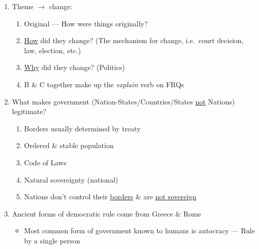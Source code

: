 \documentclass[12pt]{article}
\begin{document}
\begin{enumerate}
\begin{itemize}
    \end{itemize}

  \item Theme $\longrightarrow$ change:

    \begin{enumerate}

      \item Original — How were things originally?

      \item \underline{How} did they change? (The mechanism for change, i.e.\ court decision, law, election, etc.)

      \item \underline{Why} did they change? (Politics)

      \item B \& C together make up the \textit{explain} verb on FRQs

    \end{enumerate}

    \newpage

  \item What makes government (Nation-States/Countries/States \underline{not} Nations) legitimate?

    \begin{enumerate}

      \item Borders usually determined by treaty

      \item Ordered \& stable population

      \item Code of Laws

      \item Natural sovereignty (national)

      \item Nations don't control their \underline{borders} \& are \underline{not sovereign}

    \end{enumerate}

  \item Ancient forms of democratic rule come from Greece \& Rome

    \begin{itemize}

      \item Most common form of government known to humans is autocracy — Rule by a single person

    \end{itemize}


\end{enumerate}
\end{document}
